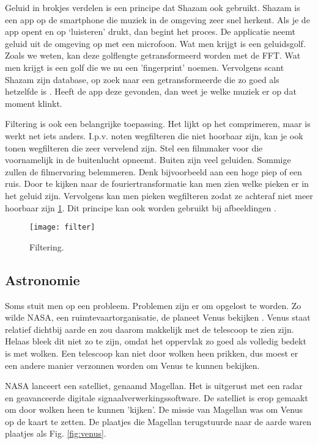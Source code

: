 \documentclass[11pt,fleqn]{book} %
\begin{document}
Geluid in brokjes verdelen is een principe dat Shazam ook gebruikt. Shazam is een app op de smartphone die muziek in de omgeving zeer snel herkent. Als je de app opent en op ‘luisteren’ drukt, dan begint het proces. De applicatie neemt geluid uit de omgeving op met een microfoon. Wat men krijgt is een geluidsgolf. Zoals we weten, kan deze golflengte getransformeerd worden met de FFT. Wat men krijgt is een golf die we nu een 'fingerprint' noemen. Vervolgens scant Shazam zijn database, op zoek naar een getransformeerde die zo goed als hetzelfde is \cite{shazam}. Heeft de app deze gevonden, dan weet je welke muziek er op dat moment klinkt. 

Filtering is ook een belangrijke toepassing. Het lijkt op het comprimeren, maar is werkt net iets anders. I.p.v. noten wegfilteren die niet hoorbaar zijn, kan je ook tonen wegfilteren die zeer vervelend zijn. Stel een filmmaker voor die voornamelijk in de buitenlucht opneemt. Buiten zijn veel geluiden. Sommige zullen de filmervaring belemmeren. Denk bijvoorbeeld aan een hoge piep of een ruis. Door te kijken naar de fouriertransformatie kan men zien welke pieken er in het geluid zijn. Vervolgens kan men pieken wegfilteren zodat ze achteraf niet meer hoorbaar zijn \ref{fig:filter}. Dit principe kan ook worden gebruikt bij afbeeldingen \cite{fc}.

\begin{figure}[h]
	\centering\texttt{[image: filter]}
	\caption{Filtering.}
	\label{fig:filter}
\end{figure}

\subsection{Astronomie}
Soms stuit men op een probleem. Problemen zijn er om opgelost te worden. Zo wilde NASA, een ruimtevaartorganisatie, de planeet Venus bekijken \cite{jg}. Venus staat relatief dichtbij aarde en zou daarom makkelijk met de telescoop te zien zijn. Helaas bleek dit niet zo te zijn, omdat het oppervlak zo goed als volledig bedekt is met wolken. Een telescoop kan niet door wolken heen prikken, dus moest er een andere manier verzonnen worden om Venus te kunnen bekijken.

NASA lanceert een satelliet, genaamd Magellan. Het is uitgerust met een radar en geavanceerde digitale signaalverwerkingssoftware. De satelliet is erop gemaakt om door wolken heen te kunnen 'kijken'. De missie van Magellan was om Venus op de kaart te zetten. De plaatjes die Magellan terugstuurde naar de aarde waren plaatjes als Fig. \ref{fig:venus}.
\end{document}
